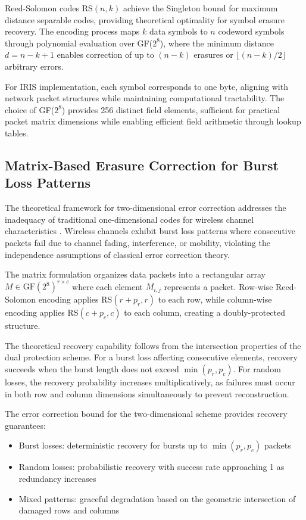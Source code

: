 Reed-Solomon codes RS$(n,k)$ achieve the Singleton bound for maximum distance separable codes, providing theoretical optimality for symbol erasure recovery. The encoding process maps $k$ data symbols to $n$ codeword symbols through polynomial evaluation over GF($2^8$), where the minimum distance $d = n-k+1$ enables correction of up to $(n-k)$ erasures or $\lfloor(n-k)/2\rfloor$ arbitrary errors.

For IRIS implementation, each symbol corresponds to one byte, aligning with network packet structures while maintaining computational tractability. The choice of GF($2^8$) provides 256 distinct field elements, sufficient for practical packet matrix dimensions while enabling efficient field arithmetic through lookup tables.

\subsection{Matrix-Based Erasure Correction for Burst Loss Patterns}

The theoretical framework for two-dimensional error correction addresses the inadequacy of traditional one-dimensional codes for wireless channel characteristics \cite{blomer2000practical}. Wireless channels exhibit burst loss patterns where consecutive packets fail due to channel fading, interference, or mobility, violating the independence assumptions of classical error correction theory.

The matrix formulation organizes data packets into a rectangular array $M \in \text{GF}(2^8)^{r \times c}$ where each element $M_{i,j}$ represents a packet. Row-wise Reed-Solomon encoding applies RS$(r+p_r, r)$ to each row, while column-wise encoding applies RS$(c+p_c, c)$ to each column, creating a doubly-protected structure.

The theoretical recovery capability follows from the intersection properties of the dual protection scheme. For a burst loss affecting consecutive elements, recovery succeeds when the burst length does not exceed $\min(p_r, p_c)$. For random losses, the recovery probability increases multiplicatively, as failures must occur in both row and column dimensions simultaneously to prevent reconstruction.

The error correction bound for the two-dimensional scheme provides recovery guarantees:
\begin{itemize}
\item Burst losses: deterministic recovery for bursts up to $\min(p_r, p_c)$ packets
\item Random losses: probabilistic recovery with success rate approaching 1 as redundancy increases
\item Mixed patterns: graceful degradation based on the geometric intersection of damaged rows and columns
\end{itemize}

